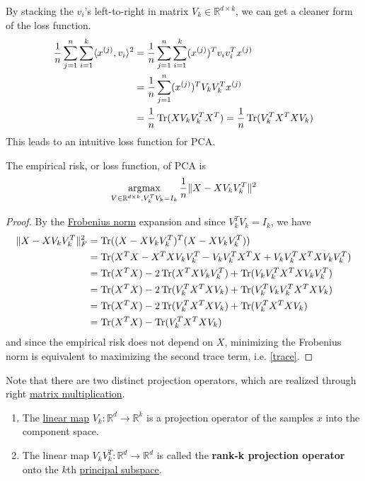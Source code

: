   By stacking the $v_i$'s left-to-right in matrix $V_k \in \mathbb{R}^{d \times k}$, we can get a cleaner form of the loss function. 
  \begin{align}
    \frac{1}{n} \sum_{j=1}^n \sum_{i=1}^k \langle x^{(j)}, v_i \rangle^2 
    & = \frac{1}{n} \sum_{j=1}^n \sum_{i=1}^k (x^{(j)})^T v_i v_i^T x^{(j)} \\ 
    & = \frac{1}{n} \sum_{j=1}^n (x^{(j)})^T V_k V_k^T x^{(j)} \\ 
    & = \frac{1}{n} \operatorname{Tr}(X V_k V_k^T X^T) = \frac{1}{n} \operatorname{Tr}(V_k^T X^T  X V_k) \label{trace}
  \end{align}
  This leads to an intuitive loss function for PCA. 

  \begin{theorem}
    \label{thm:constrained-empirical-risk-of-kth-principal}
    The empirical risk, or loss function, of PCA is
    \begin{equation}
      \operatorname*{\arg\!\max}_{V \in \mathbb{R}^{d \times k}, V_k^T V_k = I_k} 
      \frac{1}{n} \| X - X V_k V_k^T\|^2
    \end{equation}
  \end{theorem} 
  \begin{proof}
    By the \hyperref[lin-def:frobenius-norm-2]{Frobenius norm} expansion and since $V_k^T V_k = I_k$, we have 
    \begin{align}
      \|X - X V_k V_k^T\|_F^2 
      & = \operatorname{Tr}((X - X V_k V_k^T)^T(X - X V_k V_k^T)) \\
      & = \operatorname{Tr}(X^T X - X^T X V_k V_k^T - V_k V_k^T X^T X + V_k V_k^T X^T X V_k V_k^T) \\
      & = \operatorname{Tr}(X^T X) - 2\operatorname{Tr}(X^T X V_k V_k^T) + \operatorname{Tr}(V_k V_k^T X^T X V_k V_k^T) \\ 
      & = \operatorname{Tr}(X^T X) - 2\operatorname{Tr}(V_k^T X^T X V_k) + \operatorname{Tr}(V_k^T V_k V_k^T X^T X V_k) \\
      & = \operatorname{Tr}(X^T X) - 2\operatorname{Tr}(V_k^T X^T X V_k) + \operatorname{Tr}(V_k^T X^T X V_k) \\ 
      & = \operatorname{Tr}(X^T X) - \operatorname{Tr}(V_k^T X^T X V_k) 
    \end{align}
    and since the empirical risk does not depend on $X$, minimizing the Frobenius norm is equivalent to maximizing the second trace term, i.e. \ref{trace}. 
  \end{proof}

  \begin{definition}
    \label{def:projection-operator}
    Note that there are two distinct projection operators, which are realized through right \hyperref[lin-def:matrix-multiplication]{matrix multiplication}. 
    \begin{enumerate}
      \item The \hyperref[lin-def:linear_map]{linear map} $V_k : \mathbb{R}^d \to \mathbb{R}^k$ is a projection operator of the samples $x$ into the component space. 
      \item The linear map $V_k V_k^T : \mathbb{R}^d \to \mathbb{R}^d$ is called the \textbf{rank-k projection operator} onto the $k$th \hyperref[def:principal-subspace]{principal subspace}. 
    \end{enumerate}
  \end{definition}


